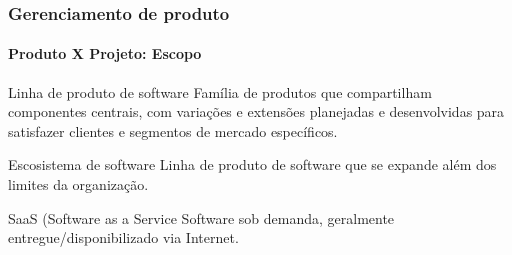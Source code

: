 \begin{frame}
	\frametitle{Gerenciamento de produto}
	\framesubtitle{Produto X Projeto: Escopo}
	
	
	\begin{block:fact}{Linha de produto de software}
		Família de produtos que compartilham componentes centrais, com variações e
		extensões planejadas e desenvolvidas para satisfazer clientes e segmentos
		de mercado específicos.
	\end{block:fact}

	\begin{block:fact}{Escosistema de software}
		Linha de produto de software que se expande além dos limites da organização.
	\end{block:fact}
	
	\begin{block:fact}{SaaS (Software as a Service}
		Software sob demanda, geralmente entregue/disponibilizado via Internet.
	\end{block:fact}

	
	\note{
		\begin{itemize}
			\item 
		\end{itemize}
	}
\end{frame}


